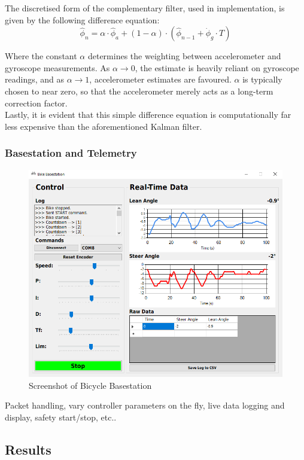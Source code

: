 The discretised form of the complementary filter, used in implementation, is given by the following difference equation:
\begin{equation*}
\hat{\phi}_n = \alpha \cdot \hat{\phi}_a + (1 - \alpha) \cdot (\hat{\phi}_{n-1} + \dot{\phi}_g \cdot T)
\end{equation*}

Where the constant $\alpha$ determines the weighting between accelerometer and gyroscope measurements. As $\alpha \rightarrow 0$, the estimate is heavily reliant on gyroscope readings, and as $\alpha \rightarrow 1$, accelerometer estimates are favoured. $\alpha$ is typically chosen to near zero, so that the accelerometer merely acts as a long-term correction factor. \\
Lastly, it is evident that this simple difference equation is computationally far less expensive than the aforementioned Kalman filter.

\subsubsection{Basestation and Telemetry}

\begin{figure}[h]
\centering
\includegraphics[scale=0.5]{Basestation}
\caption{Screenshot of Bicycle Basestation}
\label{fig:basestation}
\end{figure}

Packet handling, vary controller parameters on the fly, live data logging and display, safety start/stop, etc..

\subsection{Results}